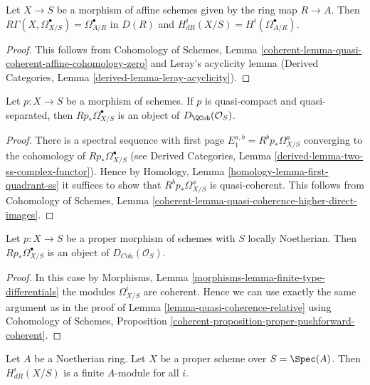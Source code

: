 \begin{lemma}
\label{lemma-de-rham-affine}
Let $X \to S$ be a morphism of affine schemes given by the ring map
$R \to A$. Then $R\Gamma(X, \Omega^\bullet_{X/S}) = \Omega^\bullet_{A/R}$
in $D(R)$ and $H^i_{dR}(X/S) = H^i(\Omega^\bullet_{A/R})$.
\end{lemma}

\begin{proof}
This follows from Cohomology of Schemes, Lemma
\ref{coherent-lemma-quasi-coherent-affine-cohomology-zero}
and Leray's acyclicity lemma
(Derived Categories, Lemma \ref{derived-lemma-leray-acyclicity}).
\end{proof}

\begin{lemma}
\label{lemma-quasi-coherence-relative}
Let $p : X \to S$ be a morphism of schemes. If $p$ is quasi-compact
and quasi-separated, then $Rp_*\Omega^\bullet_{X/S}$ is an object
of $D_\QCoh(\mathcal{O}_S)$.
\end{lemma}

\begin{proof}
There is a spectral sequence with first page
$E_1^{a, b} = R^bp_*\Omega^a_{X/S}$ converging to
the cohomology of $Rp_*\Omega^\bullet_{X/S}$
(see Derived Categories, Lemma \ref{derived-lemma-two-ss-complex-functor}).
Hence by Homology, Lemma \ref{homology-lemma-first-quadrant-ss}
it suffices to show that $R^bp_*\Omega^a_{X/S}$ is quasi-coherent.
This follows from Cohomology of Schemes, Lemma
\ref{coherent-lemma-quasi-coherence-higher-direct-images}.
\end{proof}

\begin{lemma}
\label{lemma-coherence-relative}
Let $p : X \to S$ be a proper morphism of schemes with $S$ locally
Noetherian. Then $Rp_*\Omega^\bullet_{X/S}$ is an object
of $D_{\textit{Coh}}(\mathcal{O}_S)$.
\end{lemma}

\begin{proof}
In this case by Morphisms, Lemma \ref{morphisms-lemma-finite-type-differentials}
the modules $\Omega^i_{X/S}$ are coherent. Hence we can use exactly the
same argument as in the proof of Lemma \ref{lemma-quasi-coherence-relative}
using Cohomology of Schemes, Proposition
\ref{coherent-proposition-proper-pushforward-coherent}.
\end{proof}

\begin{lemma}
\label{lemma-finite-de-Rham}
Let $A$ be a Noetherian ring. Let $X$ be a proper scheme over $S = \Spec(A)$.
Then $H^i_{dR}(X/S)$ is a finite $A$-module for all $i$.
\end{lemma}

